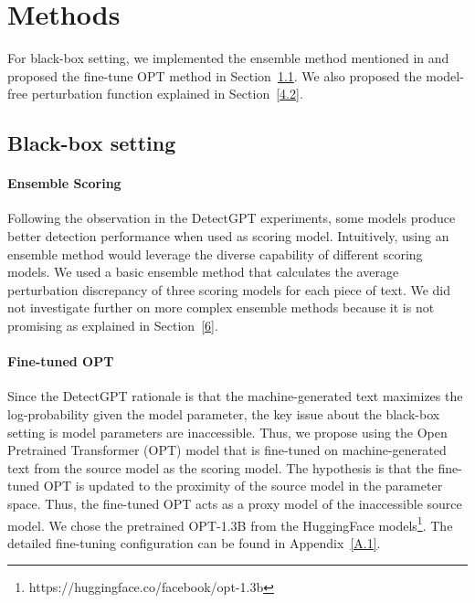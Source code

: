 \documentclass[11pt]{article}
\begin{document}
\section{Methods}
For black-box setting, we implemented the ensemble method mentioned in \citet{detectgpt} and proposed the fine-tune OPT method in Section~\ref{4.1}. We also proposed the model-free perturbation function explained in Section~\ref{4.2}.

\subsection{Black-box setting} \label{4.1}
\paragraph{Ensemble Scoring} Following the observation in the DetectGPT experiments, some models produce better detection performance when used as scoring model. Intuitively, using an ensemble method would leverage the diverse capability of different scoring models. We used a basic ensemble method that calculates the average perturbation discrepancy of three scoring models for each piece of text. We did not investigate further on more complex ensemble methods because it is not promising as explained in Section~\ref{6}.

\paragraph{Fine-tuned OPT} Since the DetectGPT rationale is that the machine-generated text maximizes the log-probability given the model parameter, the key issue about the black-box setting is model parameters are inaccessible. Thus, we propose using the Open Pretrained Transformer (OPT) model \citep{Zhang2022OPTOP} that is fine-tuned on machine-generated text from the source model as the scoring model. The hypothesis is that the fine-tuned OPT is updated to the proximity of the source model in the parameter space. Thus, the fine-tuned OPT acts as a proxy model of the inaccessible source model. We chose the pretrained OPT-1.3B from the HuggingFace models\footnote{https://huggingface.co/facebook/opt-1.3b}. The detailed fine-tuning configuration can be found in Appendix~\ref{A.1}.
\end{document}

